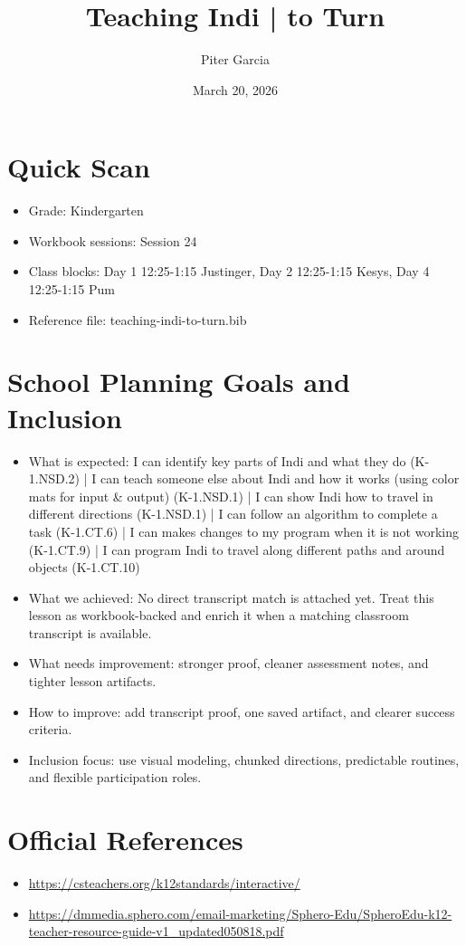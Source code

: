 \documentclass[11pt]{article}
\title{Teaching Indi | to Turn}
\author{Piter Garcia}
\date{March 20, 2026}
\begin{document}
    \maketitle
    \section*{Quick Scan}
    \begin{itemize}[leftmargin=*]
    \item Grade: Kindergarten
    \item Workbook sessions: Session 24
    \item Class blocks: Day 1 12:25-1:15 Justinger, Day 2 12:25-1:15 Kesys, Day 4 12:25-1:15 Pum
    \item Reference file: teaching-indi-to-turn.bib
    \end{itemize}
    \section*{School Planning Goals and Inclusion}
    \begin{itemize}[leftmargin=*]
    \item What is expected: I can identify key parts of Indi and what they do (K-1.NSD.2) | I can teach someone else about Indi and how it works (using color mats for input & output) (K-1.NSD.1) | I can show Indi how to travel in different directions (K-1.NSD.1) | I can follow an algorithm to complete a task (K-1.CT.6) | I can makes changes to my program when it is not working (K-1.CT.9) | I can program Indi to travel along different paths and around objects (K-1.CT.10)
    \item What we achieved: No direct transcript match is attached yet. Treat this lesson as workbook-backed and enrich it when a matching classroom transcript is available.
    \item What needs improvement: stronger proof, cleaner assessment notes, and tighter lesson artifacts.
    \item How to improve: add transcript proof, one saved artifact, and clearer success criteria.
    \item Inclusion focus: use visual modeling, chunked directions, predictable routines, and flexible participation roles.
    \end{itemize}
    \section*{Official References}
    \begin{itemize}[leftmargin=*]
    \item \url{https://csteachers.org/k12standards/interactive/}
\item \url{https://dmmedia.sphero.com/email-marketing/Sphero-Edu/SpheroEdu-k12-teacher-resource-guide-v1_updated050818.pdf}

    \end{itemize}
    
\end{document}
